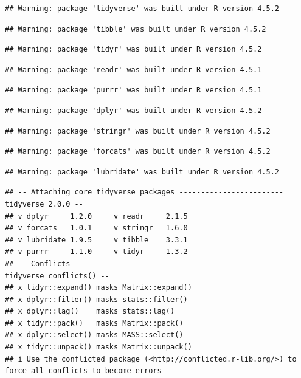 \documentclass[
]{article}
\begin{document}
\begin{verbatim}
## Warning: package 'tidyverse' was built under R version 4.5.2
\end{verbatim}

\begin{verbatim}
## Warning: package 'tibble' was built under R version 4.5.2
\end{verbatim}

\begin{verbatim}
## Warning: package 'tidyr' was built under R version 4.5.2
\end{verbatim}

\begin{verbatim}
## Warning: package 'readr' was built under R version 4.5.1
\end{verbatim}

\begin{verbatim}
## Warning: package 'purrr' was built under R version 4.5.1
\end{verbatim}

\begin{verbatim}
## Warning: package 'dplyr' was built under R version 4.5.2
\end{verbatim}

\begin{verbatim}
## Warning: package 'stringr' was built under R version 4.5.2
\end{verbatim}

\begin{verbatim}
## Warning: package 'forcats' was built under R version 4.5.2
\end{verbatim}

\begin{verbatim}
## Warning: package 'lubridate' was built under R version 4.5.2
\end{verbatim}

\begin{verbatim}
## -- Attaching core tidyverse packages ------------------------ tidyverse 2.0.0 --
## v dplyr     1.2.0     v readr     2.1.5
## v forcats   1.0.1     v stringr   1.6.0
## v lubridate 1.9.5     v tibble    3.3.1
## v purrr     1.1.0     v tidyr     1.3.2
## -- Conflicts ------------------------------------------ tidyverse_conflicts() --
## x tidyr::expand() masks Matrix::expand()
## x dplyr::filter() masks stats::filter()
## x dplyr::lag()    masks stats::lag()
## x tidyr::pack()   masks Matrix::pack()
## x dplyr::select() masks MASS::select()
## x tidyr::unpack() masks Matrix::unpack()
## i Use the conflicted package (<http://conflicted.r-lib.org/>) to force all conflicts to become errors
\end{verbatim}
\end{document}
